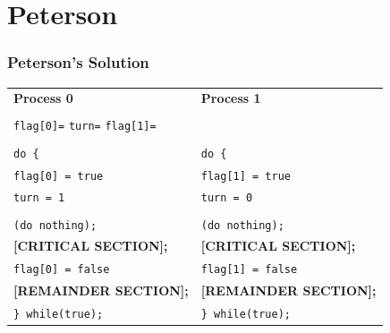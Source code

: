 \documentclass[xcolor=table, notheorems, hyperref={pdfpagelabels=false}]{beamer}
\begin{document}
\section{Peterson}
\begin{frame}
\frametitle{Peterson's Solution}
\begin{tabular}{l  l}
\textbf{Process 0} &
\textbf{Process 1} \\
&\\
\multicolumn{2}{l}{
\hspace{10pt}
\texttt{flag[0]=} 
\hspace{60pt}
\texttt{turn=}
\hspace{20pt}
\texttt{flag[1]=} 
} \\
&\\
\texttt{do \{} & 
\texttt{do \{} \\
\hspace{18pt}\texttt{flag[0] = true} &
\hspace{18pt}\texttt{flag[1] = true} \\
\hspace{18pt}\texttt{turn = 1} &
\hspace{18pt}\texttt{turn = 0} \\
\hspace{18pt}{while (flag[1] \&\& turn == 1)} &
\hspace{18pt}{while (flag[0] \&\& turn == 0)} \\
\hspace{28pt}\texttt{(do nothing);} &
\hspace{28pt}\texttt{(do nothing);} \\
\hspace{18pt}\textbf{[CRITICAL SECTION];} &
\hspace{18pt}\textbf{[CRITICAL SECTION];} \\
\hspace{18pt}\texttt{flag[0] = false} &
\hspace{18pt}\texttt{flag[1] = false} \\
\hspace{18pt}\textbf{[REMAINDER SECTION];} &
\hspace{18pt}\textbf{[REMAINDER SECTION];} \\
\texttt{\} while(true);} &
\texttt{\} while(true);} \\
\end{tabular}
\end{frame}

\end{document}
